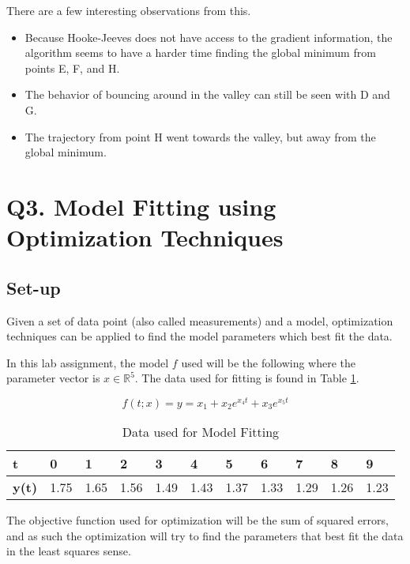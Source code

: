 \documentclass{article}
\begin{document}
    There are a few interesting observations from this.
    \begin{itemize}
        \item Because Hooke-Jeeves does not have access to the gradient information, the algorithm seems to have a harder time finding the global minimum from points E, F, and H.
        \item The behavior of bouncing around in the valley can still be seen with D and G.
        \item The trajectory from point H went towards the valley, but away from the global minimum.
    \end{itemize}

    \section{Q3. Model Fitting using Optimization Techniques}

    \subsection{Set-up}

    Given a set of data point (also called measurements) and a model, optimization techniques can be applied to find the model parameters which best fit the data.

    In this lab assignment, the model $f$ used will be the following where the parameter vector is $x \in \mathbb{R}^5$. The data used for fitting is found in Table \ref{tab:Q3_Data}.

    \begin{equation}
        f(t ; x) = y = x_1 + x_2 e^{x_4 t} + x_3 e^{x_5 t}
    \end{equation}

    \begin{table}[]
        \centering
        \begin{tabular}{|l|l|l|l|l|l|l|l|l|l|l|}
        \hline
        \textbf{t}    & 0    & 1    & 2    & 3    & 4    & 5    & 6    & 7    & 8    & 9    \\ \hline
        \textbf{y(t)} & 1.75 & 1.65 & 1.56 & 1.49 & 1.43 & 1.37 & 1.33 & 1.29 & 1.26 & 1.23 \\ \hline
        \end{tabular}
        \caption{Data used for Model Fitting}
        \label{tab:Q3_Data}
    \end{table}

    The objective function used for optimization will be the sum of squared errors, and as such the optimization will try to find the parameters that best fit the data in the least squares sense.
\end{document}

